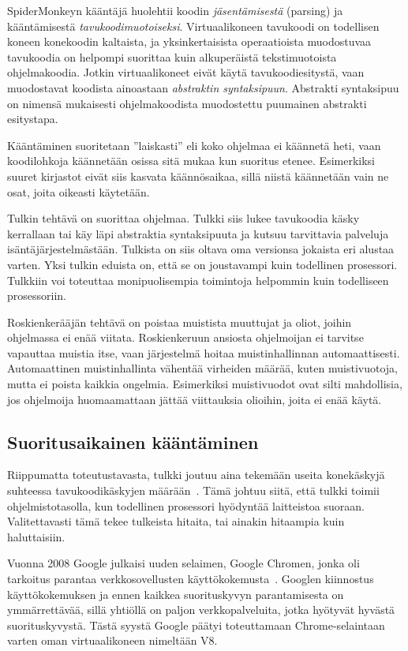 SpiderMonkeyn kääntäjä huolehtii koodin \textit{jäsentämisestä} (parsing) ja kääntämisestä \textit{tavukoodimuotoiseksi}. Virtuaalikoneen tavukoodi on todellisen koneen konekoodin kaltaista, ja yksinkertaisista operaatioista muodostuvaa tavukoodia on helpompi suorittaa kuin alkuperäistä tekstimuotoista ohjelmakoodia. Jotkin virtuaalikoneet eivät käytä tavukoodiesitystä, vaan muodostavat koodista ainoastaan \textit{abstraktin syntaksipuun}. Abstrakti syntaksipuu on nimensä mukaisesti ohjelmakoodista muodostettu puumainen abstrakti esitystapa.

Kääntäminen suoritetaan ''laiskasti'' eli koko ohjelmaa ei käännetä heti, vaan koodilohkoja käännetään osissa sitä mukaa kun suoritus etenee. Esimerkiksi suuret kirjastot eivät siis kasvata käännösaikaa, sillä niistä käännetään vain ne osat, joita oikeasti käytetään.

Tulkin tehtävä on suorittaa ohjelmaa. Tulkki siis lukee tavukoodia käsky kerrallaan tai käy läpi abstraktia syntaksipuuta ja kutsuu tarvittavia palveluja isäntäjärjestelmästään. Tulkista on siis oltava oma versionsa jokaista eri alustaa varten. Yksi tulkin eduista on, että se on joustavampi kuin todellinen prosessori. Tulkkiin voi toteuttaa monipuolisempia toimintoja helpommin kuin todelliseen prosessoriin.

Roskienkerääjän tehtävä on poistaa muistista muuttujat ja oliot, joihin ohjelmassa ei enää viitata. Roskienkeruun ansiosta ohjelmoijan ei tarvitse vapauttaa muistia itse, vaan järjestelmä hoitaa muistinhallinnan automaattisesti. Automaattinen muistinhallinta vähentää virheiden määrää, kuten muistivuotoja, mutta ei poista kaikkia ongelmia. Esimerkiksi muistivuodot ovat silti mahdollisia, jos ohjelmoija huomaamattaan jättää viittauksia olioihin, joita ei enää käytä.

\subsection{Suoritusaikainen kääntäminen}

Riippumatta toteutustavasta, tulkki joutuu aina tekemään useita konekäskyjä suhteessa tavukoodikäskyjen määrään~\cite[s.~35]{vms}. Tämä johtuu siitä, että tulkki toimii ohjelmistotasolla, kun todellinen prosessori hyödyntää laitteistoa suoraan. Valitettavasti tämä tekee tulkeista hitaita, tai ainakin hitaampia kuin haluttaisiin.

Vuonna 2008 Google julkaisi uuden selaimen, Google Chromen, jonka oli tarkoitus parantaa verkkosovellusten käyttökokemusta~\cite{chromepress}. Googlen kiinnostus käyttökokemuksen ja ennen kaikkea suorituskyvyn parantamisesta on ymmärrettävää, sillä yhtiöllä on paljon verkkopalveluita, jotka hyötyvät hyvästä suorituskyvystä. Tästä syystä Google päätyi toteuttamaan Chrome-selaintaan varten oman virtuaalikoneen nimeltään V8.

